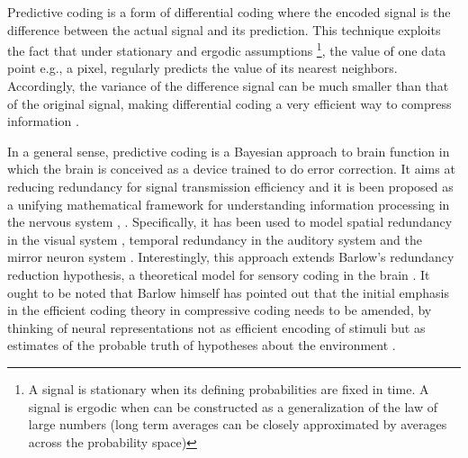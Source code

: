 \documentclass[11pt, onecolumn]{article}
\begin{document}
Predictive coding is a form of differential coding where the encoded signal is the difference between the actual signal and its prediction. This technique exploits the fact that under stationary and ergodic assumptions \footnote{A signal is stationary when its defining probabilities are fixed in time. A signal is ergodic when can be constructed as a generalization of the law of large numbers (long term averages can be closely approximated by averages across the probability space)}, the value of one data point e.g., a pixel, regularly predicts the value of its nearest neighbors. Accordingly, the variance of the difference signal can be much smaller than that of the original signal, making differential coding a very efficient way to compress information \citep{shi_image_1999}.

In a general sense, predictive coding is a Bayesian approach to brain function in which the brain is conceived as a device trained to do error correction. It aims at reducing redundancy for signal transmission efficiency and it is been proposed as a unifying mathematical framework for understanding information processing in the nervous system \citep{Friston:2010}, \citep{huang_predictive_2011}. Specifically, it has been used to model spatial redundancy in the visual system \citep{srinivasan_predictive_1982}, temporal redundancy in the auditory system \citep{baldeweg_repetition_2006} and the mirror neuron system \citep{kilner_predictive_2007}. Interestingly, this approach extends Barlow's redundancy reduction hypothesis, a theoretical model for sensory coding in the brain \citep{Barlow:1972}. It ought to be noted that Barlow himself has pointed out that the initial emphasis in the efficient coding theory in compressive coding %
needs to be amended, by thinking of neural representations not as efficient encoding of stimuli but as estimates of the probable truth of hypotheses about the environment \citep{barlow_redundancy_2001}. 
\end{document}
